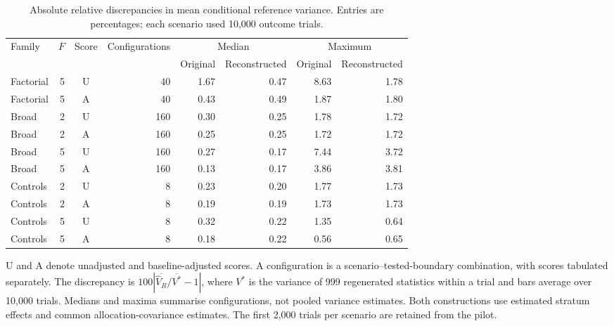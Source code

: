 \documentclass[12pt,a4paper]{article}
\theoremstyle{definition}
\begin{document}


\clearpage
\begin{table}[!htbp]
\centering
\caption{Absolute relative discrepancies in mean conditional reference variance. Entries are percentages; each scenario used 10,000 outcome trials.}
\label{tab:pilot-covariance}
\begin{threeparttable}
\small
\begin{tabular}{@{}lrcrrrrr@{}}
\toprule
Family & $F$ & Score & Configurations & \multicolumn{2}{c}{Median} & \multicolumn{2}{c}{Maximum}\\
 & & & & Original & Reconstructed & Original & Reconstructed\\
\midrule
Factorial & 5 & U & 40 & 1.67 & 0.47 & 8.63 & 1.78\\
Factorial & 5 & A & 40 & 0.43 & 0.49 & 1.87 & 1.80\\
Broad & 2 & U & 160 & 0.30 & 0.25 & 1.78 & 1.72\\
Broad & 2 & A & 160 & 0.25 & 0.25 & 1.72 & 1.72\\
Broad & 5 & U & 160 & 0.27 & 0.17 & 7.44 & 3.72\\
Broad & 5 & A & 160 & 0.13 & 0.17 & 3.86 & 3.81\\
Controls & 2 & U & 8 & 0.23 & 0.20 & 1.77 & 1.73\\
Controls & 2 & A & 8 & 0.19 & 0.19 & 1.73 & 1.73\\
Controls & 5 & U & 8 & 0.32 & 0.22 & 1.35 & 0.64\\
Controls & 5 & A & 8 & 0.18 & 0.22 & 0.56 & 0.65\\
\bottomrule
\end{tabular}
\begin{tablenotes}[flushleft]\small
\item[] U and A denote unadjusted and baseline-adjusted scores. A configuration is a scenario--tested-boundary combination, with scores tabulated separately. The discrepancy is $100|\overline{\widehat V_R}/\overline{V^*}-1|$, where $V^*$ is the variance of 999 regenerated statistics within a trial and bars average over 10,000 trials. Medians and maxima summarise configurations, not pooled variance estimates. Both constructions use estimated stratum effects and common allocation-covariance estimates. The first 2,000 trials per scenario are retained from the pilot.
\end{tablenotes}
\end{threeparttable}
\end{table}
\end{document}
